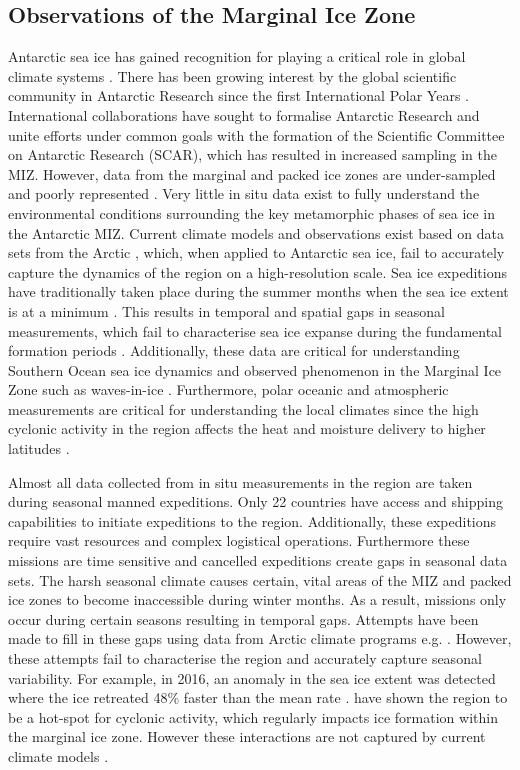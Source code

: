 \subsection{Observations of the Marginal Ice Zone}
Antarctic sea ice has gained recognition for playing a critical role in global climate systems \cite{kennicutt2016delivering}. There has been growing interest by the global scientific community in Antarctic Research since the first International Polar Years \cite{kennicutt2016delivering}. International collaborations have sought to formalise Antarctic Research and unite efforts under common goals \cite{kennicutt2016delivering} with the formation of the Scientific Committee on Antarctic Research (SCAR), which has resulted in increased sampling in the MIZ. However, data from the marginal and packed ice zones are under-sampled and poorly represented \cite{vichi2019effects}. Very little in situ data exist to fully understand the environmental conditions surrounding the key metamorphic phases of sea ice in the Antarctic MIZ. Current climate models and observations exist based on data sets from the Arctic \cite{vichi2019effects}, which, when applied to Antarctic sea ice, fail to accurately capture the dynamics of the region on a high-resolution scale. Sea ice expeditions have traditionally taken place during the summer months when the sea ice extent is at a minimum \cite{kennicutt2016delivering}. This results in temporal and spatial gaps in seasonal measurements, which fail to characterise sea ice expanse during the fundamental formation periods \cite{MAKSYM2012seaiceextent}. Additionally, these data are critical for understanding Southern Ocean sea ice dynamics and observed phenomenon in the Marginal Ice Zone such as waves-in-ice \cite{kohout2014storm}. Furthermore, polar oceanic and atmospheric measurements are critical for understanding the local climates since the high cyclonic activity in the region affects the heat and moisture delivery to higher latitudes \cite{vichi2019effects}.

Almost all data collected from in situ measurements in the region are taken during seasonal manned expeditions. Only 22 countries have access and shipping capabilities to initiate expeditions to the region. Additionally, these expeditions require vast resources and complex logistical operations. Furthermore these missions are time sensitive and cancelled expeditions create gaps in seasonal data sets. The harsh seasonal climate causes certain, vital areas of the MIZ and packed ice zones to become inaccessible during winter months. As a result, missions only occur during certain seasons resulting in temporal gaps. Attempts have been made to fill in these gaps using data from Arctic climate programs e.g. \textcite{lee2012program}. However, these attempts fail to characterise the region and accurately capture seasonal variability. For example, in 2016, an anomaly in the sea ice extent was detected where the ice retreated 48\% faster than the mean rate \cite{turner2017unprecedented}. \textcite{vichi2019effects} have shown the region to be a hot-spot for cyclonic activity, which regularly impacts ice formation within the marginal ice zone. However these interactions are not captured by current climate models \cite{vichi2019effects}.\par

